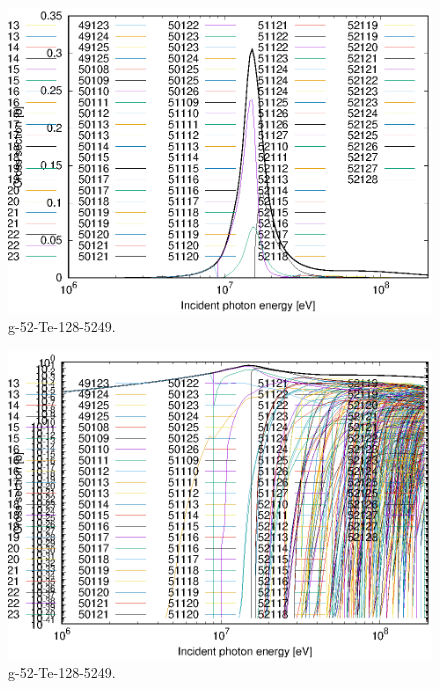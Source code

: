 \begin{figure}
 \includegraphics[width=\linewidth]{eps/g_52-Te-128_5249.eps}
  \caption{g-52-Te-128-5249.}
\end{figure}
\begin{figure}
 \includegraphics[width=\linewidth]{eps-log/g_52-Te-128_5249.eps}
 \caption{g-52-Te-128-5249.}
\end{figure}
\newpage \clearpage

